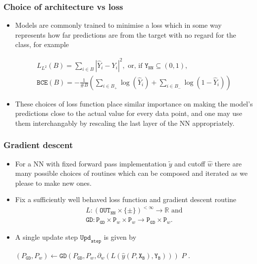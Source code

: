 \documentclass{beamer}
\newcommand{\OUT}{{\texttt{Y}}}
\newcommand{\OUTSMOOTH}{{\texttt{OUT}_{\texttt{NN}}}}
\newcommand{\TWO}{\{\pm\}}
\newcommand{\PAR}{{\texttt{P}}}
\newcommand{\GD}{{\texttt{GD}}}
\newcommand{\CO}{{\hat w}}
\newcommand{\PRED}{{\hat y}}%
\newcommand{\PREDSMOOTH}{{\tilde y}}%
\newcommand{\YP}{{\hat Y}}
\newcommand{\UPDSTEP}{{\texttt{Upd}_{\texttt{step}}}}
\newcommand{\XB}{{\texttt{X}_{\texttt{B}}}}
\newcommand{\YB}{{\texttt{Y}_{\texttt{B}}}}
\begin{document}
\begin{frame}
\frametitle{Choice of architecture vs loss}
\begin{itemize}
\item
Models are commonly trained to minimise a loss which in some way represents how far predictions are from the target with no regard for the class, for example

\begin{gather*}
  L_{L^2}(B)=\sum_{i\in B} |\YP_i-Y_i|^2,\text{ or, if }\OUT_{\texttt{NN}}\subseteq(0,1),\\
  \texttt{BCE}(B)=-\tfrac1{\#B}\left(\sum_{i\in B_+}\log(\hat Y_i)+\sum_{i\in B_-}\log(1-\hat Y_i)\right)
\end{gather*}
\item
These choices of loss function place similar importance on making the model's predictions close to the actual value for every data point, and one may use them interchangably by rescaling the last layer of the NN appropriately.
\end{itemize}
\end{frame}
\begin{frame}
\frametitle{Gradient descent}
\begin{itemize}
\item
  For a NN with fixed forward pass implementation $\PREDSMOOTH$ and cutoff $\CO$ there are many possible choices of routines which can be composed and iterated as we please to make new ones.
\item
  Fix a sufficiently well behaved loss function and gradient descent routine
    \begin{gather*}
      L:(\OUTSMOOTH\times\TWO)^{<\infty}\rightarrow\mathbb R\text{ and}\\
      \GD:\PAR_\GD\times\PAR_w\times\PAR_w\rightarrow\PAR_\GD\times\PAR_w.
    \end{gather*}
\item
A single update step $\UPDSTEP$ is given by
\begin{algorithmic}[0]
\Function{$\UPDSTEP$}{$P,\XB,\YB$}
  \State $(P_\GD,P_w)\gets\GD(P_\GD,P_w,\partial_w(L(\PRED(P,\XB),\YB)))$
  \State\Return $P$
\EndFunction.
\end{algorithmic}
\end{itemize}
\end{frame}
\end{document}
